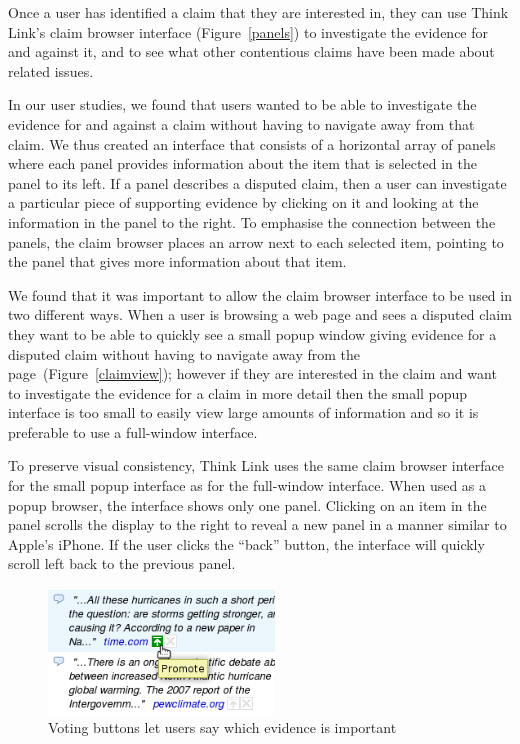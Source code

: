 \documentclass{chi2009}
\begin{document}
Once a user has identified a claim that they are interested in, they can use Think Link's claim browser interface (Figure~\ref{panels}) to investigate the evidence for and against it, and to see what other contentious claims have been made about related issues. 

In our user studies, we found that users wanted to be able to investigate the evidence for and against a claim without having to navigate away from that claim. We thus created an interface that consists of a horizontal array of panels where each panel provides information about the item that is selected in the panel to its left. If a panel describes a disputed claim, then a user can investigate a particular piece of supporting evidence by clicking on it and looking at the information in the panel to the right. To emphasise the connection between the panels, the claim browser places an arrow next to each selected item, pointing to the panel that gives more information about that item.

We found that it was important to allow the claim browser interface to be used in two different ways. When a user is browsing a web page and sees a disputed claim they want to be able to quickly see a small popup window giving evidence for a disputed claim without having to navigate away from the page~(Figure~\ref{claimview}); however if they are interested in the claim and want to investigate the evidence for a claim in more detail then the small popup interface is too small to easily view large amounts of information and so it is preferable to use a full-window interface. 

To preserve visual consistency, Think Link uses the same claim browser interface for the small popup interface as for the full-window interface. When used as a popup browser, the interface shows only one panel. Clicking on an item in the panel scrolls the display to the right to reveal a new panel in a manner similar to Apple's iPhone. If the user clicks the ``back'' button, the interface will quickly scroll left back to the previous panel.

\begin{figure}[tb]
	\begin{center}
	\includegraphics[width=6cm]{../screenshots/v2_vote.png}
	\caption{Voting buttons let users say which evidence is important}
	\label{voting}
	\end{center}
\end{figure}
\end{document}
